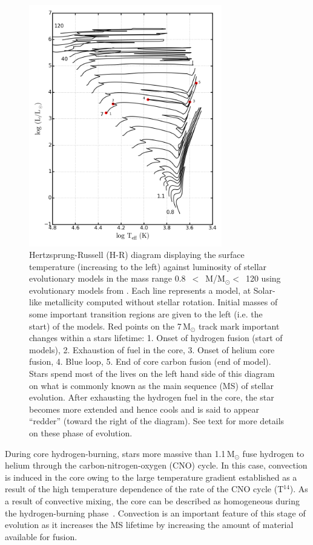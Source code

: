 \begin{figure}
 \centering
 \includegraphics[width=0.75\textwidth]{intro/HRD-geneva}
 \caption[Hertzsprung-Russell (H-R) diagram of stars]{
Hertzsprung-Russell (H-R) diagram displaying the surface temperature (increasing to the left) against luminosity of stellar evolutionary models in the mass range
0.8~$<$~M/M$_{\odot}<$~120 using evolutionary models from
\protect\citet{2012A&A...537A.146E}.
Each line represents a model, at Solar-like metallicity computed without stellar rotation.
Initial masses of some important transition regions are given to the left (i.e. the start) of the models.
Red points on the 7\,M$_{\odot}$ track mark important changes within a stars lifetime:
1. Onset of hydrogen fusion (start of models),
2. Exhaustion of fuel in the core,
3. Onset of helium core fusion,
4. Blue loop,
5. End of core carbon fusion (end of model).
Stars spend most of the lives on the left hand side of this diagram on what is commonly known as the main sequence (MS) of stellar evolution.
After exhausting the hydrogen fuel in the core, the star becomes more extended and hence cools and is said to appear ``redder'' (toward the right of the diagram).
See text for more details on these phase of evolution.
 \label{fig:HRD}}
\end{figure}


During core hydrogen-burning, stars more massive than 1.1\,M$_{\odot}$ fuse hydrogen to helium through the carbon-nitrogen-oxygen (CNO) cycle.
In this case, convection is induced in the core owing to the large temperature gradient established as a result of the high temperature dependence of the rate of the CNO cycle (T$^{14}$).
As a result of convective mixing, the core can be described as homogeneous during the hydrogen-burning phase~\citep{2012sse..book.....K}.
Convection is an important feature of this stage of evolution as it increases the MS lifetime by increasing the amount of material available for fusion.

